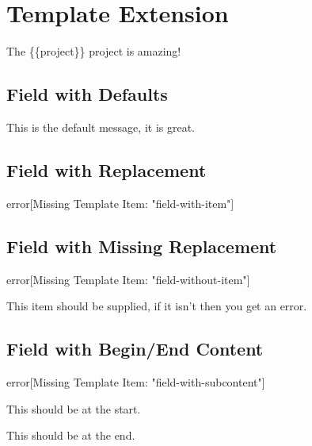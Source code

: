 
\chapter{\label{template-extension}Template Extension}
\par The \{\{project\}\} project is amazing!
\section{\label{field-with-defaults}Field with Defaults}
\par This is the default message, it is great.
\section{\label{field-with-replacement}Field with Replacement}
\begin{alert}[error]{error}[Missing Template Item: "field-with-item"]

\end{alert}

\section{\label{field-with-missing-replacement}Field with Missing Replacement}
\begin{alert}[error]{error}[Missing Template Item: "field-without-item"]

\par This item should be supplied, if it isn't then you get an error.
\end{alert}

\section{\label{field-with-begin-end-content}Field with Begin/End Content}
\begin{alert}[error]{error}[Missing Template Item: "field-with-subcontent"]

\par This should be at the start.
\par This should be at the end.
\end{alert}
